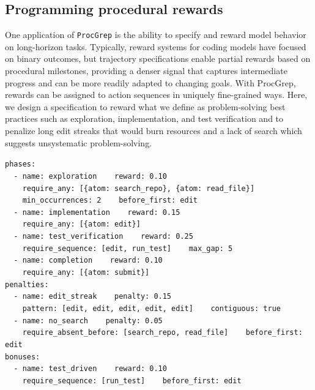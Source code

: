 \documentclass[11pt]{article}
\begin{document}
  \subsection{Programming procedural rewards}
  One application of \texttt{ProcGrep} is the ability to specify and reward model behavior on
  long-horizon tasks. Typically, reward systems for coding models have focused on binary outcomes, but trajectory
  specifications enable partial rewards based on procedural milestones, providing a denser signal that captures
  intermediate progress and can be more readily adapted to changing goals. With ProcGrep, rewards can be assigned to action
  sequences in uniquely fine-grained ways. Here, we design a specification to reward what we define as problem-solving best practices such as
  exploration, implementation, and test verification and to penalize long edit streaks that would burn resources and a lack of search which
  suggests unsystematic problem-solving.

  \begin{tcolorbox}[colback=black!3, colframe=black!30, boxrule=0.4pt, left=10pt, right=10pt, top=8pt, bottom=8pt,
  fontupper=\small]
  \texttt{phases:}\\
  \texttt{~~- name: exploration~~~~reward: 0.10}\\
  \texttt{~~~~require\_any: [\{atom: search\_repo\}, \{atom: read\_file\}]}\\
  \texttt{~~~~min\_occurrences: 2~~~~before\_first: edit}\\
  \texttt{~~- name: implementation~~~~reward: 0.15}\\
  \texttt{~~~~require\_any: [\{atom: edit\}]}\\
  \texttt{~~- name: test\_verification~~~~reward: 0.25}\\
  \texttt{~~~~require\_sequence: [edit, run\_test]~~~~max\_gap: 5}\\
  \texttt{~~- name: completion~~~~reward: 0.10}\\
  \texttt{~~~~require\_any: [\{atom: submit\}]}\\
  \texttt{penalties:}\\
  \texttt{~~- name: edit\_streak~~~~penalty: 0.15}\\
  \texttt{~~~~pattern: [edit, edit, edit, edit, edit]~~~~contiguous: true}\\
  \texttt{~~- name: no\_search~~~~penalty: 0.05}\\
  \texttt{~~~~require\_absent\_before: [search\_repo, read\_file]~~~~before\_first: edit}\\
  \texttt{bonuses:}\\
  \texttt{~~- name: test\_driven~~~~reward: 0.10}\\
  \texttt{~~~~require\_sequence: [run\_test]~~~~before\_first: edit}
  \end{tcolorbox}
\end{document}
